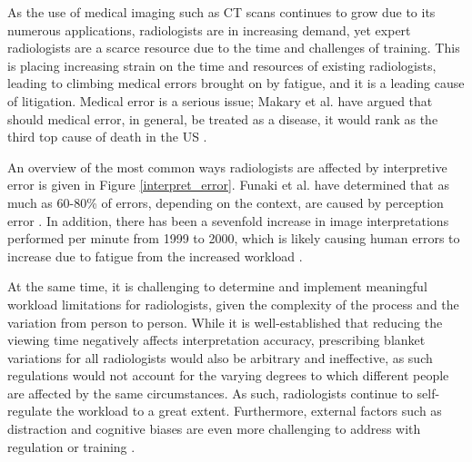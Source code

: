 As the use of medical imaging such as CT scans continues to grow due to its numerous applications, radiologists are in increasing demand, yet expert radiologists are a scarce resource due to the time and challenges of training. This is placing increasing strain on the time and resources of existing radiologists, leading to climbing medical errors brought on by fatigue, and it is a leading cause of litigation. Medical error is a serious issue; Makary et al. have argued that should medical error, in general, be treated as a disease, it would rank as the third top cause of death in the US \cite{medical_error}. 

An overview of the most common ways radiologists are affected by interpretive error is given in Figure \ref{interpret_error}. Funaki et al. have determined that as much as 60-80\% of errors, depending on the context, are caused by perception error \cite{perception_error}. In addition, there has been a sevenfold increase in image interpretations performed per minute from 1999 to 2000, which is likely causing human errors to increase due to fatigue from the increased workload \cite{radiology_error}. 

At the same time, it is challenging to determine and implement meaningful workload limitations for radiologists, given the complexity of the process and the variation from person to person. While it is well-established that reducing the viewing time negatively affects interpretation accuracy, prescribing blanket variations for all radiologists would also be arbitrary and ineffective, as such regulations would not account for the varying degrees to which different people are affected by the same circumstances. As such, radiologists continue to self-regulate the workload to a great extent. Furthermore, external factors such as distraction and cognitive biases are even more challenging to address with regulation or training \cite{workload}. 

